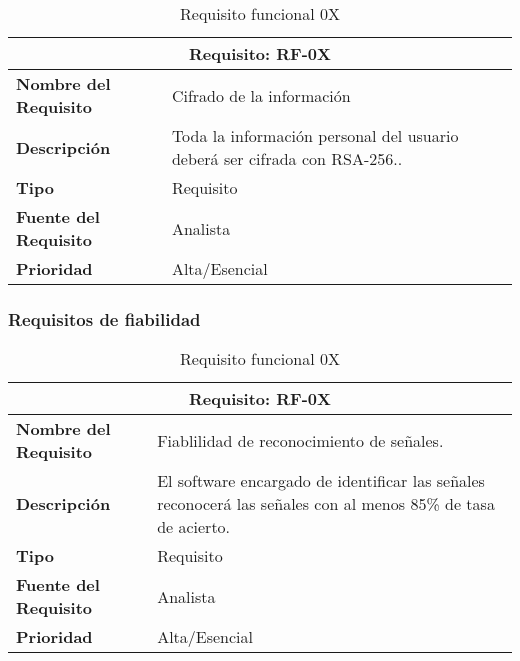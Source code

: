 \begin{table}[H]
\begin{center}
\begin{tabular}{p{} p{7cm}}
\multicolumn{2}{c}{\textbf{Requisito: RF-0X} } \\
\hline \hline
\textbf{Nombre del Requisito} & Cifrado de la información\\
\hline
\textbf{Descripción} & Toda la información personal del usuario deberá ser cifrada con RSA-256..\\
\hline
\textbf{Tipo} & Requisito  \\
\hline
\textbf{Fuente del Requisito} & Analista  \\
\hline
\textbf{Prioridad} & Alta/Esencial \\ \hline
\end{tabular}
\caption{Requisito funcional 0X}
\label{tab:personal}
\end{center}
\end{table}

\subsubsection{Requisitos de fiabilidad}

\begin{table}[H]
\begin{center}
\begin{tabular}{p{} p{7cm}}
\multicolumn{2}{c}{\textbf{Requisito: RF-0X} } \\
\hline \hline
\textbf{Nombre del Requisito} & Fiablilidad de reconocimiento de señales.\\
\hline
\textbf{Descripción} &  El software encargado de identificar las señales reconocerá las señales con al menos 85\% de tasa de acierto.\\
\hline
\textbf{Tipo} & Requisito  \\
\hline
\textbf{Fuente del Requisito} & Analista  \\
\hline
\textbf{Prioridad} & Alta/Esencial \\ \hline
\end{tabular}
\caption{Requisito funcional 0X}
\label{tab:personal}
\end{center}
\end{table}

